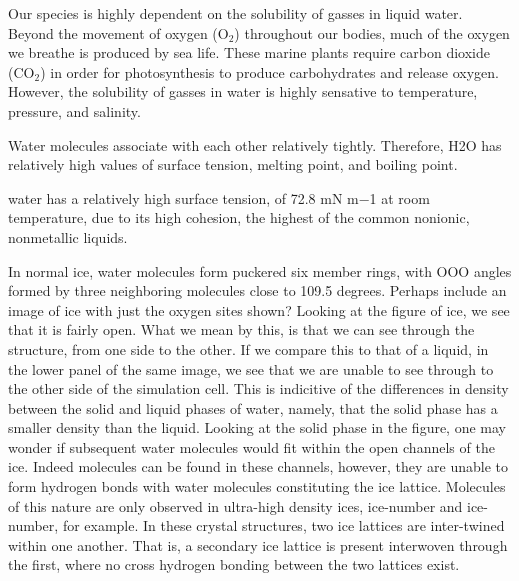Our species is highly dependent on the solubility of gasses in liquid
water. Beyond the movement of oxygen (O$_{2}$) throughout
our bodies, much of the oxygen we breathe is produced by sea
life. These marine plants require carbon dioxide
(CO$_{2}$) in order for photosynthesis to produce
carbohydrates and release oxygen. However, the solubility of gasses in
water is highly sensative to temperature, pressure, and salinity. 

Water molecules associate with each other relatively
tightly. Therefore, H2O has relatively high values of surface tension,
melting point, and boiling point.

water has a relatively high surface tension, of 72.8 mN m−1 at room
temperature, due to its high cohesion, the highest of the common
nonionic, nonmetallic liquids.

In normal ice, water molecules form puckered six member rings, with
OOO angles formed by three neighboring molecules close to 109.5
degrees. Perhaps include an image of ice with just the oxygen sites
shown? Looking at the figure of ice, we see that it is fairly
open. What we mean by this, is that we can see through the structure,
from one side to the other. If we compare this to that of a liquid, in
the lower panel of the same image, we see that we are unable to see
through to the other side of the simulation cell. This is indicitive
of the differences in density between the solid and liquid phases of
water, namely, that the solid phase has a smaller density than the
liquid. Looking at the solid phase in the figure, one may wonder if
subsequent water molecules would fit within the open channels of the
ice. Indeed molecules can be found in these channels, however, they
are unable to form hydrogen bonds with water molecules constituting
the ice lattice. Molecules of this nature are only observed in
ultra-high density ices, ice-number and ice-number, for example. In
these crystal structures, two ice lattices are inter-twined within one
another. That is, a secondary ice lattice is present interwoven
through the first, where no cross hydrogen bonding between the two
lattices exist.

